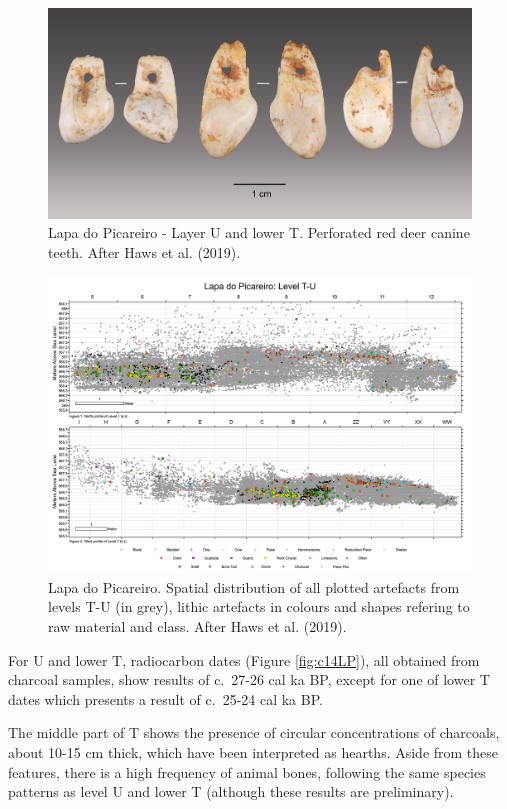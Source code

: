 \documentclass[12pt,twoside]{reedthesis}
\begin{document}
~
\begin{figure}

{\centering \includegraphics[width=0.8\linewidth]{figure/LP_teeth} 

}

\caption{Lapa do Picareiro - Layer U and lower T. Perforated red deer canine teeth. After Haws et al. (2019).}\label{fig:teeth}
\end{figure}
\begin{landscape}
\begin{figure}

{\centering \includegraphics[width=0.8\linewidth]{figure/LPspatial} 

}

\caption{Lapa do Picareiro. Spatial distribution of all plotted artefacts from levels T-U (in grey), lithic artefacts in colours and shapes refering to raw material and class. After Haws et al. (2019).}\label{fig:spatialut}
\end{figure}
\end{landscape}
For U and lower T, radiocarbon dates (Figure \ref{fig:c14LP}), all obtained from charcoal samples, show results of c.~27-26 cal ka BP, except for one of lower T dates which presents a result of c.~25-24 cal ka BP.

The middle part of T shows the presence of circular concentrations of charcoals, about 10-15 cm thick, which have been interpreted as hearths. Aside from these features, there is a high frequency of animal bones, following the same species patterns as level U and lower T (although these results are preliminary).
\end{document}
